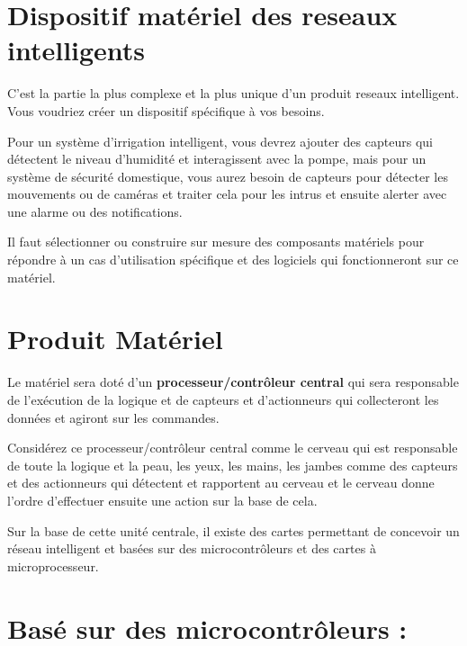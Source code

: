 \documentclass[12pt]{report}
\begin{document}
\hypertarget{dispositif-matuxe9riel-de-lreseaux intelligent}{%
      \section{\texorpdfstring{Dispositif matériel des reseaux intelligents
        }{Dispositif matériel des réseaux intelligents }}\label{dispositif-matuxe9riel-de-lreseaux intelligent}}

C'est la partie la plus complexe et la plus unique d'un produit reseaux intelligent.
Vous voudriez créer un dispositif spécifique à vos besoins.

Pour un système d'irrigation intelligent, vous devrez ajouter des
capteurs qui détectent le niveau d'humidité et interagissent avec la
pompe, mais pour un système de sécurité domestique, vous aurez besoin de
capteurs pour détecter les mouvements ou de caméras et traiter cela pour
les intrus et ensuite alerter avec une alarme ou des notifications.

Il faut sélectionner ou construire sur mesure des composants matériels
pour répondre à un cas d'utilisation spécifique et des logiciels qui
fonctionneront sur ce matériel.

\hypertarget{produit-matuxe9riel}{%
      \section{\texorpdfstring{Produit Matériel
        }{Produit Matériel }}\label{produit-matuxe9riel}}

Le matériel sera doté d'un \textbf{processeur/contrôleur central} qui sera
responsable de l'exécution de la logique et de capteurs et d'actionneurs
qui collecteront les données et agiront sur les commandes.

Considérez ce processeur/contrôleur central comme le cerveau qui est
responsable de toute la logique et la peau, les yeux, les mains, les
jambes comme des capteurs et des actionneurs qui détectent et rapportent
au cerveau et le cerveau donne l'ordre d'effectuer ensuite une action
sur la base de cela.

Sur la base de cette unité centrale, il existe des cartes permettant de concevoir un réseau intelligent et basées sur
des microcontrôleurs et des cartes à microprocesseur.

\hypertarget{basuxe9-sur-des-microcontruxf4leurs}{%
      \section{\texorpdfstring{Basé sur des microcontrôleurs :
        }{Basé sur des microcontrôleurs : }}\label{basuxe9-sur-des-microcontruxf4leurs}}
\end{document}
